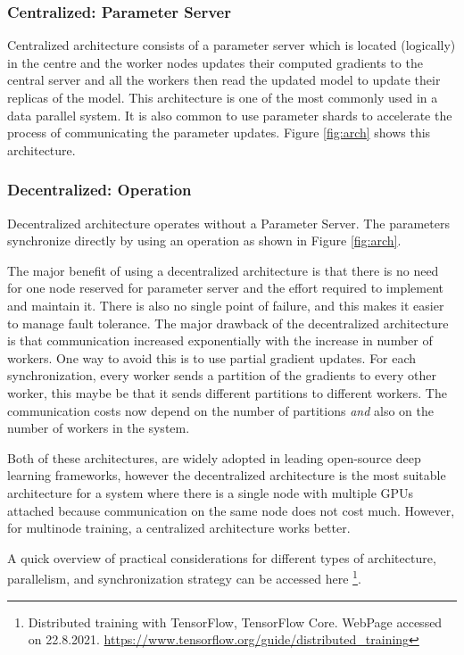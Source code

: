 \subsubsection{Centralized: Parameter Server}
Centralized architecture consists of a parameter server which is located (logically) in the centre and the worker nodes updates their computed gradients to the central server and all the workers then read the updated model to update their replicas of the model. This architecture is one of the most commonly used in a data parallel system. It is also common to use parameter shards to accelerate the process of communicating the parameter updates. Figure \ref{fig:arch} shows this architecture.

\subsubsection{Decentralized:  Operation}
Decentralized architecture operates without a Parameter Server. The parameters synchronize directly by using an  operation as shown in Figure \ref{fig:arch}. 

The major benefit of using a decentralized architecture is that there is no need for one node reserved for parameter server and the effort required to implement and maintain it. There is also no single point of failure, and this makes it easier to manage fault tolerance. The major drawback of the decentralized architecture is that communication increased exponentially with the increase in number of workers. One way to avoid this is to use partial gradient updates. For each synchronization, every worker sends a partition of the gradients to every other worker, this maybe be that it sends different partitions to different workers.  The communication costs now depend on the number of partitions \emph{and} also on the number of workers in the system. 

Both of these architectures, are widely adopted in leading open-source deep learning frameworks, however the decentralized architecture is the most suitable architecture for a system where there is a single node with multiple GPUs attached because communication on the same node does not cost much. However, for multinode training, a centralized architecture works better. 

A quick overview of practical considerations for different types of architecture, parallelism, and synchronization strategy can be accessed here \footnote{Distributed training with TensorFlow, TensorFlow Core. WebPage accessed on 22.8.2021. \href{https://www.tensorflow.org/guide/distributed\_training}{https://www.tensorflow.org/guide/distributed\_training} }. 


